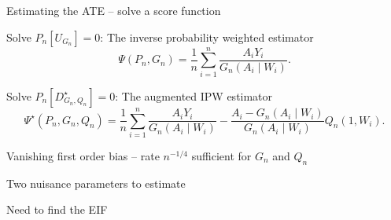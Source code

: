 \documentclass[smaller]{beamer}\usepackage{listings}
\begin{document}
\begin{frame}[label={sec:orgb3a9318}]{Estimating the ATE -- solve a score function}
\pause
\begin{block}{Solve \(P_n[U_{G_n}] = 0\): The inverse probability weighted estimator}
\begin{equation*}
  \Psi(P_n, G_n) = \frac{1}{n}\sum_{i=1}^{n}\frac{A_iY_i}{G_n(A_i \mid W_i)}.
\end{equation*}
\pause
\end{block}
\begin{block}{Solve \(P_n[D^{\star}_{G_n, Q_n}] = 0\): The augmented IPW estimator}
\begin{equation*}
  \Psi^{\star}(P_n, G_n, Q_n) = \frac{1}{n}\sum_{i=1}^{n}\frac{A_iY_i}{G_n(A_i \mid W_i)} -
  \frac{A_i - G_n(A_i \mid W_i)}{G_n(A_i \mid W_i)}Q_n(1, W_i).
\end{equation*}

\hfill

\pause
\begin{description}[\leftmargin=1em]
\item[{\color{green}\(\checkmark\)}] Vanishing first order bias -- rate \(n^{-1/4}\) sufficient for \(G_n\)
and \(Q_n\) \pause
\item[{\color{red}\(\times\)}] Two nuisance parameters to estimate \pause
\item[{\color{red}\(\times\)}] Need to find the EIF
\end{description}
\end{block}
\end{frame}
\end{document}
